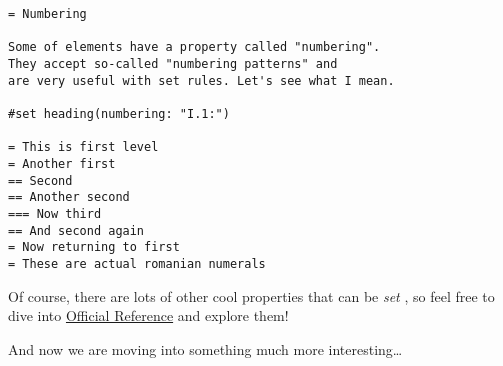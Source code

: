 \begin{verbatim}
= Numbering

Some of elements have a property called "numbering".
They accept so-called "numbering patterns" and
are very useful with set rules. Let's see what I mean.

#set heading(numbering: "I.1:")

= This is first level
= Another first
== Second
== Another second
=== Now third
== And second again
= Now returning to first
= These are actual romanian numerals
\end{verbatim}

\pandocbounded{}

Of course, there are lots of other cool properties that can be
\emph{set} , so feel free to dive into
\href{https://typst.app/docs/reference/}{Official Reference} and explore
them!

And now we are moving into something much more interesting\ldots{}



